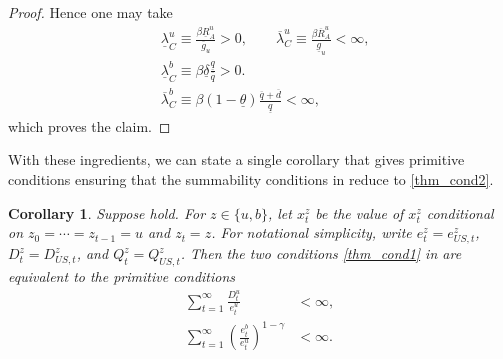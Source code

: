 \documentclass[12pt]{article}
\theoremstyle{plain}
\newtheorem{coro}{Corollary}
\begin{document}
\begin{proof}
Hence one may take
\begin{align*}
    &\underline\lambda^u_C\equiv \frac{\beta\underline R^u_A}{\overline g_u}>0,
\qquad
\overline\lambda^u_C\equiv \frac{\beta\overline R^u_A}{\underline g_u}<\infty,
\\ &
\underline\lambda^b_C
\equiv
\beta\underline\delta\frac{\underline q}{\overline q}>0.
\\ &
\overline\lambda^b_C
\equiv
\beta(1-\underline{\theta})\frac{\overline q+\overline d}{\underline{q}}<\infty,
\end{align*}
which proves the claim.
\end{proof}


With these ingredients, we can state a single
corollary that gives primitive conditions ensuring that the summability conditions
in  reduce to \eqref{thm_cond2}.

\begin{coro}\label{coro1}
Suppose
hold. 
For $z\in\{u,b\}$, let $x_t^z$ be the value of $x_{t}^z$ conditional on $z_0=\cdots=z_{t-1}=u$ and $z_t=z$.
For notational simplicity, write \(e_t^z=e_{US,t}^z\),
\(D_t^z=D_{US,t}^z\), and \(Q_t^z=Q_{US,t}^z\).
Then the two conditions \eqref{thm_cond1} in  are equivalent to the primitive conditions
\begin{subequations}\label{thm_cond2}
\begin{align}
\sum_{t=1}^\infty \frac{D_t^u}{e_{t}^u}&<\infty, \label{thm_cond_2a}\\
\sum_{t=1}^\infty
\left(\frac{e_{t}^b}{e_{t}^u}\right)^{1-\gamma}&<\infty. \label{thm_cond_2b}
\end{align}
\end{subequations}
\end{coro}
\end{document}
